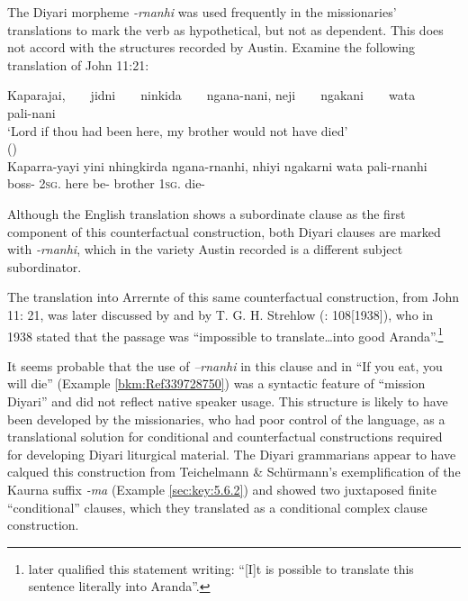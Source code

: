 The Diyari morpheme \textit{-rnanhi} was used frequently in the missionaries' translations to mark the verb as hypothetical, but not as dependent. This does not accord with the structures recorded by Austin. Examine the following translation of John 11:21:

\ea   Kaparajai, ~ ~ jidni ~ ~      ninkida ~ ~     ngana-nani,       neji ~ ~      ngakani ~  ~ wata ~ ~    pali-nani\\
\glt `Lord if thou had been here, my brother would not have died' \\
(\citealt{reuther_testamenta_1897}) \\
\gll Kaparra-yayi      yini           nhingkirda  ngana{}-rnanhi,   nhiyi      ngakarni       wata       pali-rnanhi\\
boss-  2\textsc{sg}.   here     be-       brother   1\textsc{sg}.         die-\\
\z


Although the English translation shows a subordinate clause as the first component of this counterfactual construction, both Diyari clauses are marked with \textit{-rnanhi}, which in the variety Austin recorded is a different subject subordinator.

The translation into Arrernte of this same counterfactual construction, from John 11: 21, was later discussed by \citet[23]{kempe_grammar_1891} and by T. G. H. Strehlow (\citeyear{strehlow_aranda_1944}: 108[1938]), who in 1938 stated that the passage was “impossible to translate…into good Aranda”.\footnote{\citet[108]{strehlow_aranda_1944} later qualified this statement writing: “[I]t is possible to translate this sentence literally into Aranda”.}

It seems probable that the use of \textit{–rnanhi} in this clause and in “If you eat, you will die” (Example \ref{bkm:Ref339728750}) was a syntactic feature of “mission Diyari” and did not reflect native speaker usage. This structure is likely to have been developed by the missionaries, who had poor control of the language, as a translational solution for conditional and counterfactual constructions required for developing Diyari liturgical material. The Diyari grammarians appear to have calqued this construction from Teichelmann \& Schürmann’s exemplification of the Kaurna suffix \textit{-ma} (Example \ref{sec:key:5.6.2}) and showed two juxtaposed finite “conditional” clauses, which they translated as a conditional complex clause construction.

